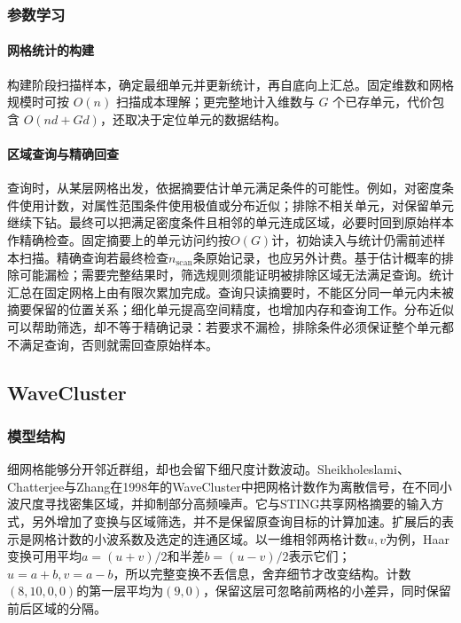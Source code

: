 \subsubsection{参数学习}

\paragraph{网格统计的构建}

构建阶段扫描样本，确定最细单元并更新统计，再自底向上汇总。固定维数和网格规模时可按 $O(n)$ 扫描成本理解；更完整地计入维数与 $G$ 个已存单元，代价包含 $O(nd+Gd)$，还取决于定位单元的数据结构。

\paragraph{区域查询与精确回查}

查询时，从某层网格出发，依据摘要估计单元满足条件的可能性。例如，对密度条件使用计数，对属性范围条件使用极值或分布近似；排除不相关单元，对保留单元继续下钻。最终可以把满足密度条件且相邻的单元连成区域，必要时回到原始样本作精确检查。固定摘要上的单元访问约按$O(G)$计，初始读入与统计仍需前述样本扫描。精确查询若最终检查$n_{\mathrm{scan}}$条原始记录，也应另外计费。基于估计概率的排除可能漏检；需要完整结果时，筛选规则须能证明被排除区域无法满足查询。统计汇总在固定网格上由有限次累加完成。查询只读摘要时，不能区分同一单元内未被摘要保留的位置关系；细化单元提高空间精度，也增加内存和查询工作。分布近似可以帮助筛选，却不等于精确记录：若要求不漏检，排除条件必须保证整个单元都不满足查询，否则就需回查原始样本。
\subsection{WaveCluster}

\subsubsection{模型结构}

细网格能够分开邻近群组，却也会留下细尺度计数波动。Sheikholeslami、Chatterjee与Zhang在1998年的WaveCluster中把网格计数作为离散信号，在不同小波尺度寻找密集区域，并抑制部分高频噪声。它与STING共享网格摘要的输入方式，另外增加了变换与区域筛选，并不是保留原查询目标的计算加速。扩展后的表示是网格计数的小波系数及选定的连通区域。以一维相邻两格计数$u,v$为例，Haar变换可用平均$a=(u+v)/2$和半差$b=(u-v)/2$表示它们；$u=a+b,v=a-b$，所以完整变换不丢信息，舍弃细节才改变结构。计数$(8,10,0,0)$的第一层平均为$(9,0)$，保留这层可忽略前两格的小差异，同时保留前后区域的分隔。

